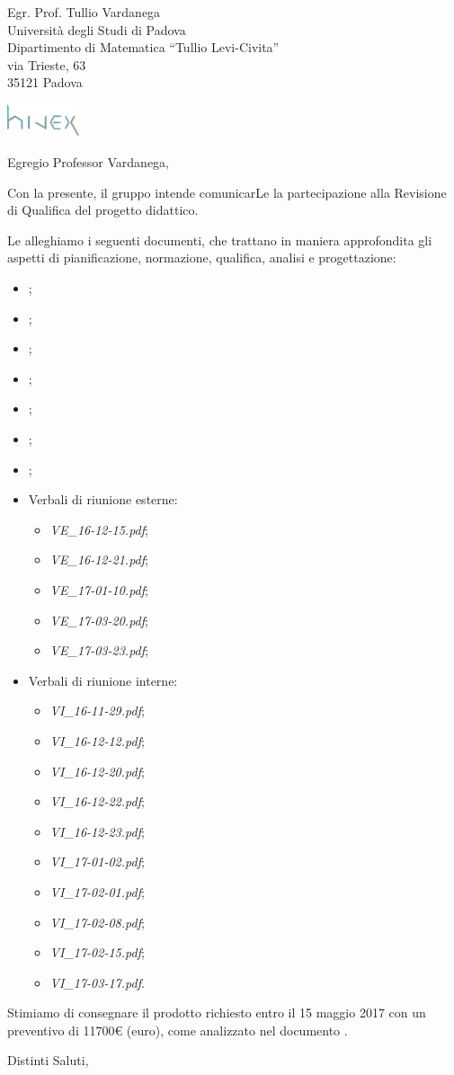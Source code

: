 \documentclass[a4paper]{letter} %
\date{Padova, \today}
\begin{document}
\begin{letter}{Egr. Prof. Tullio Vardanega\\
Università degli Studi di Padova\\
Dipartimento di Matematica “Tullio Levi-Civita”\\
via Trieste, 63\\
35121 Padova}

\includegraphics[width=80px]{../../util/hivex_logo3.png}

\opening{Egregio Professor Vardanega,}

Con la presente, il gruppo \hx{} intende comunicarLe la partecipazione alla Revisione di Qualifica del progetto didattico.

Le alleghiamo i seguenti documenti, che trattano in maniera approfondita gli aspetti di pianificazione, normazione, qualifica, analisi e progettazione:
\begin{itemize}
	\item \NdP;
	\item \PdP;
	\item \PdQ;
	\item \AdR;
	\item \ST;
	\item \DP;
	\item \Glossario;
	\item Verbali di riunione esterne:
	\begin{itemize}
		\item \emph{VE\_16-12-15.pdf};
		\item \emph{VE\_16-12-21.pdf};
		\item \emph{VE\_17-01-10.pdf};
		\item \emph{VE\_17-03-20.pdf};
		\item \emph{VE\_17-03-23.pdf};
	\end{itemize}
	\item Verbali di riunione interne:
	\begin{itemize}
		\item \emph{VI\_16-11-29.pdf};
		\item \emph{VI\_16-12-12.pdf};
		\item \emph{VI\_16-12-20.pdf};
		\item \emph{VI\_16-12-22.pdf};
		\item \emph{VI\_16-12-23.pdf};
		\item \emph{VI\_17-01-02.pdf};
		\item \emph{VI\_17-02-01.pdf};
		\item \emph{VI\_17-02-08.pdf};
		\item \emph{VI\_17-02-15.pdf};
		\item \emph{VI\_17-03-17.pdf}.
	\end{itemize}
\end{itemize}

Stimiamo di consegnare il prodotto richiesto entro il 15 maggio 2017 con un preventivo di \num{11700}\euro{} (euro), come analizzato nel documento \PdP.

\closing{Distinti Saluti,}

\end{letter}
\end{document}
